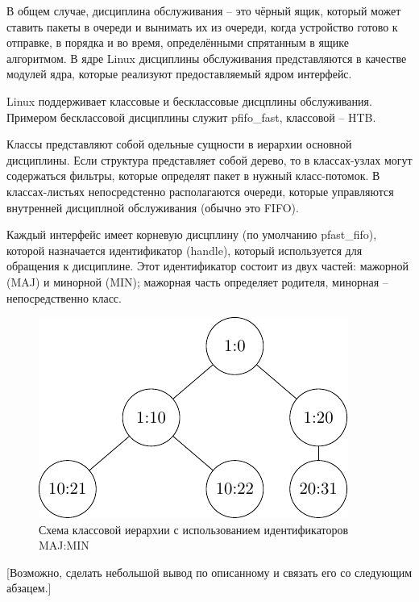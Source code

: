 
	В общем случае, дисциплина обслуживания -- это чёрный ящик, который может
	ставить пакеты в очереди и вынимать их из очереди, когда устройство
	готово к отправке, в порядка и во время, определёнными спрятанным в ящике
	алгоритмом. В ядре Linux дисциплины обслуживания представляются в качестве
	модулей ядра, которые реализуют предоставляемый ядром интерфейс.

	Linux поддерживает классовые и бесклассовые дисцплины обслуживания. Примером
	бесклассовой дисциплины служит pfifo\_fast, классовой -- HTB.


	Классы представляют собой одельные сущности в иерархии основной дисциплины.
	Если структура представляет собой дерево, то в классах-узлах могут содержаться
	фильтры, которые определят пакет в нужный класс-потомок. В классах-листьях
	непосредстенно располагаются очереди, которые управляются внутренней дисциплной
	обслуживания (обычно это FIFO). 

	Каждый интерфейс имеет корневую дисцплину (по умолчанию pfast\_fifo), которой
	назначается идентификатор (handle), который используется для обращения к дисциплине.
	Этот идентификатор состоит из двух частей: мажорной (MAJ) и минорной (MIN); мажорная
	часть определяет родителя, минорная -- непосредственно класс.

	\begin{figure}[ht!]
		\centering
		\includegraphics{./src/pdfimages/class_hierh.pdf}
		\caption{Схема классовой иерархии с использованием идентификаторов MAJ:MIN}
	\end{figure}

	[Возможно, сделать небольшой вывод по описанному и связать его со следующим абзацем.]

